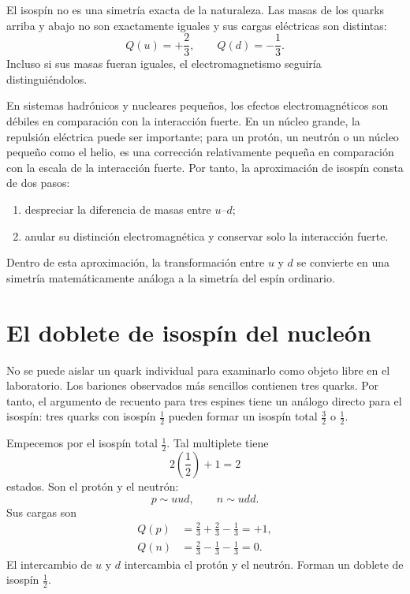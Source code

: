 El isospín no es una simetría exacta de la naturaleza. Las masas de los quarks arriba y abajo no son exactamente iguales y sus cargas eléctricas son distintas:
\begin{equation}
Q(u)=+\frac23,
\qquad
Q(d)=-\frac13.
\end{equation}
Incluso si sus masas fueran iguales, el electromagnetismo seguiría distinguiéndolos.

En sistemas hadrónicos y nucleares pequeños, los efectos electromagnéticos son débiles en comparación con la interacción fuerte. En un núcleo grande, la repulsión eléctrica puede ser importante; para un protón, un neutrón o un núcleo pequeño como el helio, es una corrección relativamente pequeña en comparación con la escala de la interacción fuerte. Por tanto, la aproximación de isospín consta de dos pasos:

\begin{enumerate}
\item despreciar la diferencia de masas entre \(u\)--\(d\);
\item anular su distinción electromagnética y conservar solo la interacción fuerte.
\end{enumerate}

Dentro de esta aproximación, la transformación entre \(u\) y \(d\) se convierte en una simetría matemáticamente análoga a la simetría del espín ordinario.

\section{El doblete de isospín del nucleón}

No se puede aislar un quark individual para examinarlo como objeto libre en el laboratorio. Los bariones observados más sencillos contienen tres quarks. Por tanto, el argumento de recuento para tres espines tiene un análogo directo para el isospín: tres quarks con isospín \(\tfrac12\) pueden formar un isospín total \(\tfrac32\) o \(\tfrac12\).

Empecemos por el isospín total \(\tfrac12\). Tal multiplete tiene
\begin{equation}
2\left(\frac12\right)+1=2
\end{equation}
estados. Son el protón y el neutrón:
\begin{equation}
p\sim uud,
\qquad
n\sim udd.
\end{equation}
Sus cargas son
\begin{align}
Q(p)
&=\frac23+\frac23-\frac13
=+1,\\
Q(n)
&=\frac23-\frac13-\frac13
=0.
\end{align}
El intercambio de \(u\) y \(d\) intercambia el protón y el neutrón. Forman un doblete de isospín \(\tfrac12\).

